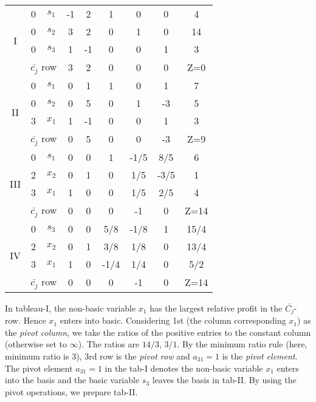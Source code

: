\documentclass[../main-sheet.tex]{subfiles}
\begin{document}
\begin{soln}
\begin{table}[H]
\begin{tabular}{ccccccccc}
    \multirow{4}[3]{*}{I} & 0     & $ s_1 $ & -1    & 2     & 1     & 0     & 0     & 4 \\
          & 0     & $ s_2 $ & 3     & 2     & 0     & 1     & 0     & 14 \\
          & 0     & $ s_3 $ & 1     & -1    & 0     & 0     & 1     & 3 \\
\cmidrule{2-9}          & \multicolumn{2}{c}{$ \bar{c_j} $ row} & 3     & 2     & 0     & 0     & 0     & Z=0 \\
    \midrule
    \multirow{4}[4]{*}{II} & 0     & $s_1$ & 0     & 1     & 1     & 0     & 1     & 7 \\
          & 0     & $s_2$ & 0     & 5     & 0     & 1     & -3    & 5 \\
          & 3     & $x_1$ & 1     & -1    & 0     & 0     & 1     & 3 \\
\cmidrule{2-9}          & \multicolumn{2}{c}{$ \bar{c_j} $ row} & 0     & 5     & 0     & 0     & -3    & Z=9 \\
    \midrule
    \multirow{4}[4]{*}{III} & 0     & $s_1$ & 0     & 0     & 1     & -1/5  & 8/5   & 6 \\
          & 2     & $ x_2$ & 0     & 1     & 0     & 1/5   & -3/5  & 1 \\
          & 3     & $x_1$ & 1     & 0     & 0     & 1/5   & 2/5   & 4 \\
\cmidrule{2-9}          & \multicolumn{2}{c}{$ \bar{c_j} $ row} & 0     & 0     & 0     & -1    & 0     & Z=14 \\
    \midrule
    \multirow{4}[4]{*}{IV} & 0     & $s_3$ & 0     & 0     & 5/8   & -1/8  & 1     & 15/4 \\
          & 2     & $ x_2$ & 0     & 1     & 3/8   & 1/8   & 0     & 13/4 \\
          & 3     & $x_1$ & 1     & 0     & -1/4  & 1/4   & 0     & 5/2 \\
\cmidrule{2-9}          & \multicolumn{2}{c}{$ \bar{c_j} $ row} & 0     & 0     & 0     & -1    & 0     & Z=14 \\
    \bottomrule
        \end{tabular}
    \end{table}
    In tableau-I, the non-basic variable \(x_1\) has the largest relative profit in the \(\bar{C_j}\)-row. Hence \(x_1\) enters into basic. Considering 1st (the column corresponding \(x_1\)) as the \emph{pivot column}, we take the ratios of the positive entries to the constant column (otherwise set to \(\infty\)). The ratios are \(14/3,\,3/1\). By the minimum ratio rule (here, minimum ratio is 3), 3rd row is the \emph{pivot row} and \(a_{31}=1\) is the \emph{pivot element}. The pivot element \(a_{31}=1\) in the tab-I denotes the non-basic variable \(x_1\) enters into the basis and the basic variable \(s_3\) leaves the basis in tab-II. By using the pivot operations, we prepare tab-II.\\


\end{soln}
\end{document}
